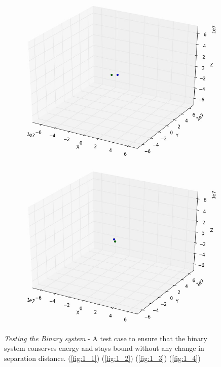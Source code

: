 \documentclass[10pt,letterpaper]{article}
\begin{document}
\begin{figure}[!htb]
  \includegraphics[width=\linewidth]{figures/three_body/1_3.png}
  \subcaption{}\label{fig:1_3}
\endminipage
{}
  \includegraphics[width=\linewidth]{figures/three_body/1_4.png}
  \subcaption{}\label{fig:1_4}
\endminipage
\caption{ \textit{Testing the Binary system} - A test case to ensure that the binary system conserves energy and stays bound without any change in separation distance.
(\ref{fig:1_1}) 
(\ref{fig:1_2}) 
(\ref{fig:1_3}) 
(\ref{fig:1_4})}\label{fig:1}
\end{figure}
\end{document}
